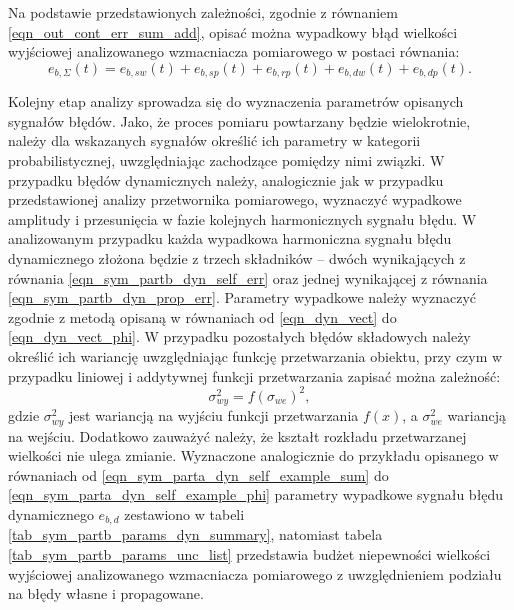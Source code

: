 Na podstawie przedstawionych zależności, zgodnie z równaniem \eqref{eqn_out_cont_err_sum_add}, opisać można wypadkowy błąd wielkości wyjściowej analizowanego wzmacniacza pomiarowego w postaci równania:
\begin{equation}
e_{b,\Sigma} \left( t \right) = e_{b,sw} \left( t \right) + e_{b,sp} \left( t \right) + e_{b,rp} \left( t \right) + e_{b,dw} \left( t \right) + e_{b,dp} \left( t \right) \label{eqn_sym_partb_error_sum}.
\end{equation}

Kolejny etap analizy sprowadza się do wyznaczenia parametrów opisanych sygnałów błędów. Jako, że proces pomiaru powtarzany będzie wielokrotnie, należy dla wskazanych sygnałów określić ich parametry w kategorii probabilistycznej, uwzględniając zachodzące pomiędzy nimi związki. W przypadku błędów dynamicznych należy, analogicznie jak w przypadku przedstawionej analizy przetwornika pomiarowego, wyznaczyć wypadkowe amplitudy i przesunięcia w fazie kolejnych harmonicznych sygnału błędu. W analizowanym przypadku każda wypadkowa harmoniczna sygnału błędu dynamicznego złożona będzie z trzech składników -- dwóch wynikających z równania \eqref{eqn_sym_partb_dyn_self_err} oraz jednej wynikającej z równania \eqref{eqn_sym_partb_dyn_prop_err}. Parametry wypadkowe należy wyznaczyć zgodnie z metodą opisaną w równaniach od \eqref{eqn_dyn_vect} do \eqref{eqn_dyn_vect_phi}. W przypadku pozostałych błędów składowych należy określić ich wariancję uwzględniając funkcję przetwarzania obiektu, przy czym w przypadku liniowej i addytywnej funkcji przetwarzania zapisać można zależność:
\begin{equation}
\sigma_{wy}^{2} = f \left( \sigma_{we} \right)^{2} \label{eqn_var_function},
\end{equation}
gdzie $\sigma_{wy}^{2}$ jest wariancją na wyjściu funkcji przetwarzania $f(x)$, a $\sigma_{we}^{2}$ wariancją na wejściu. Dodatkowo zauważyć należy, że kształt rozkładu przetwarzanej wielkości nie ulega zmianie. Wyznaczone analogicznie do przykładu opisanego w równaniach od \eqref{eqn_sym_parta_dyn_self_example_sum} do \eqref{eqn_sym_parta_dyn_self_example_phi} parametry wypadkowe sygnału błędu dynamicznego $e_{b,d}$ zestawiono w tabeli \ref{tab_sym_partb_params_dyn_summary}, natomiast tabela \ref{tab_sym_partb_params_unc_list} przedstawia budżet niepewności wielkości wyjściowej analizowanego wzmacniacza pomiarowego z uwzględnieniem podziału na błędy własne i propagowane.

